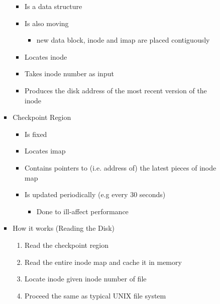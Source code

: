 \documentclass[12pt]{article}
\begin{document}
\begin{enumerate}[1.]
\begin{enumerate}[1)]
\begin{itemize}
\begin{itemize}
                \begin{itemize}
                    \item Is a data structure
                    \item Is also moving
                    \begin{itemize}
                        \item new data block, inode and imap are placed contiguously
                    \end{itemize}
                    \item Locates inode
                    \item Takes inode number as input
                    \item Produces the disk address of the most recent version of the inode
                \end{itemize}

                \item Checkpoint Region

                \begin{itemize}
                    \item Is fixed
                    \item Locates imap
                    \item Contains pointers to (i.e. address of) the latest pieces of inode map
                    \item Is updated periodically (e.g every 30 seconds)
                    \begin{itemize}
                        \item Done to ill-affect performance
                    \end{itemize}
                \end{itemize}

                \item How it works (Reading the Disk)

                \begin{enumerate}[1.]
                    \item Read the checkpoint region
                    \item Read the entire inode map and cache it in memory
                    \item Locate inode given inode number of file
                    \item Proceed the same as typical UNIX file system
                \end{enumerate}
            \end{itemize}
        \end{itemize}
    \end{enumerate}


\end{enumerate}
\end{document}
